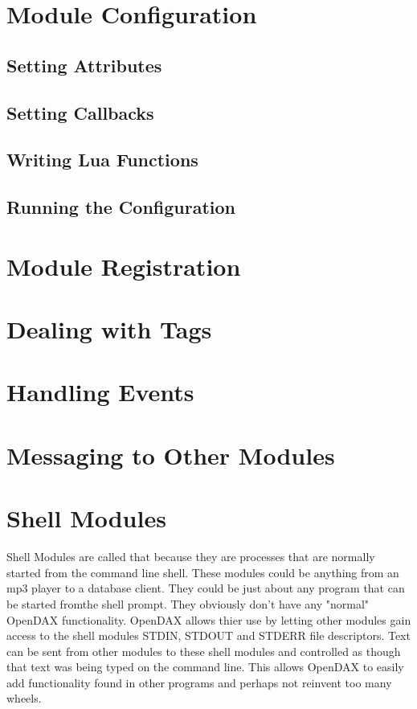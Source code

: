 \documentclass[letterpaper,10pt]{report}
\begin{document}
\chapter*{Module Configuration}
\section*{Setting Attributes}
\section*{Setting Callbacks}
\section*{Writing Lua Functions}
\section*{Running the Configuration}

\chapter*{Module Registration}

\chapter*{Dealing with Tags}

\chapter*{Handling Events}

\chapter*{Messaging to Other Modules}

\chapter*{Shell Modules}
Shell Modules are called that because they are processes that are normally started from the command line shell.  These modules could be anything from an mp3 player to a database client.  They could be just about any program that can be started fromthe shell prompt.  They obviously don't have any "normal" OpenDAX functionality.  OpenDAX allows thier use by letting other modules gain access to the shell modules STDIN, STDOUT and STDERR file descriptors.  Text can be sent from other modules to these shell modules and controlled as though that text was being typed on the command line.  This allows OpenDAX to easily add functionality found in other programs and perhaps not reinvent too many wheels.
\end{document}
